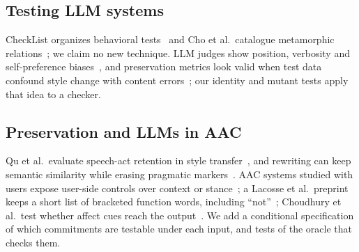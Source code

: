 \documentclass[conference,10pt]{IEEEtran}
\newcommand{\say}[1]{``#1''}
\begin{document}
\subsection{Testing LLM systems}
CheckList organizes behavioral tests~\cite{ribeiro2020checklist} and Cho et al.\ catalogue metamorphic relations~\cite{cho2025metamorphic}; we claim no new technique.
LLM judges show position, verbosity and self-preference biases~\cite{zheng2023judging}, and preservation metrics look valid when test data confound style change with content errors~\cite{pauli2025stylegap}; our identity and mutant tests apply that idea to a checker.

\subsection{Preservation and LLMs in AAC}
Qu et al.\ evaluate speech-act retention in style transfer~\cite{qu2023conditioning}, and rewriting can keep semantic similarity while erasing pragmatic markers~\cite{navneet2026voice}.
AAC systems studied with users expose user-side controls over context or stance~\cite{valencia2023less,valencia2024compa}; a Lacosse et al.\ preprint keeps a short list of bracketed function words, including \say{not}~\cite{lacosse2026cognitivesteering}; Choudhury et al.\ test whether affect cues reach the output~\cite{choudhury2025alignment}.
We add a conditional specification of which commitments are testable under each input, and tests of the oracle that checks them.

\end{document}
